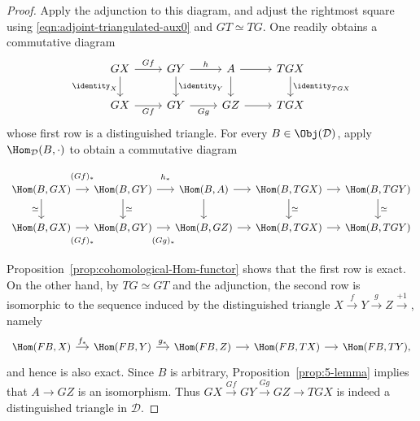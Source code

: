 \begin{proof}
	Apply the adjunction to this diagram, and adjust the rightmost square
	using \eqref{eqn:adjoint-triangulated-aux0} and $GT \simeq TG$. One
	readily obtains a commutative diagram
	\[\begin{tikzcd}
		GX \arrow[r, "Gf"] \arrow[d, "\identity_X"'] & GY \arrow[d, "\identity_Y"] \arrow[r, "h"] & A \arrow[r] \arrow[d] & TGX \arrow[d, "\identity_{TGX}"] \\
		GX \arrow[r, "Gf"'] & GY \arrow[r, "Gg"'] & GZ \arrow[r] & TGX
	\end{tikzcd}\]
	whose first row is a distinguished triangle. For every
	$B \in \Obj(\mathcal{D})$, apply $\Hom_{\mathcal{D}}(B, \cdot)$ to obtain
	a commutative diagram
	\[\begin{tikzcd}[column sep=small, every cell/.append style={font=\small}]
		\Hom(B, GX) \arrow[r, "(Gf)_*" inner sep=0.8em] \arrow[d, "\simeq"'] & \Hom(B, GY) \arrow[r, "h_*" inner sep=0.8em] \arrow[d, "\simeq"] & \Hom(B, A) \arrow[d] \arrow[r] & \Hom(B, TGX) \arrow[r] \arrow[d, "\simeq"] & \Hom(B, TGY) \arrow[d, "\simeq"] \\
		\Hom(B, GX) \arrow[r, "(Gf)_*"' inner sep=0.8em] & \Hom(B, GY) \arrow[r, "(Gg)_*"' inner sep=0.8em] & \Hom(B, GZ) \arrow[r] & \Hom(B, TGX) \arrow[r] & \Hom(B, TGY)
	\end{tikzcd}\]
	Proposition~\ref{prop:cohomological-Hom-functor} shows that the first row
	is exact. On the other hand, by $TG \simeq GT$ and the adjunction, the
	second row is isomorphic to the sequence induced by the distinguished
	triangle $X \xrightarrow{f} Y \xrightarrow{g} Z \xrightarrow{+1}$,
	namely
	\[\begin{tikzcd}[column sep=small, every cell/.append style = {font = \small}]
		\Hom(FB, X) \arrow[r, "f_*"] & \Hom(FB, Y) \arrow[r, "g_*"] & \Hom(FB, Z) \arrow[r] & \Hom(FB, TX) \arrow[r] & \Hom(FB, TY) ,
	\end{tikzcd}\]
	and hence is also exact. Since $B$ is arbitrary,
	Proposition~\ref{prop:5-lemma} implies that $A \to GZ$ is an isomorphism.
	Thus $GX \xrightarrow{Gf} GY \xrightarrow{Gg} GZ \to TGX$ is indeed a
	distinguished triangle in $\mathcal{D}$.
\end{proof}


